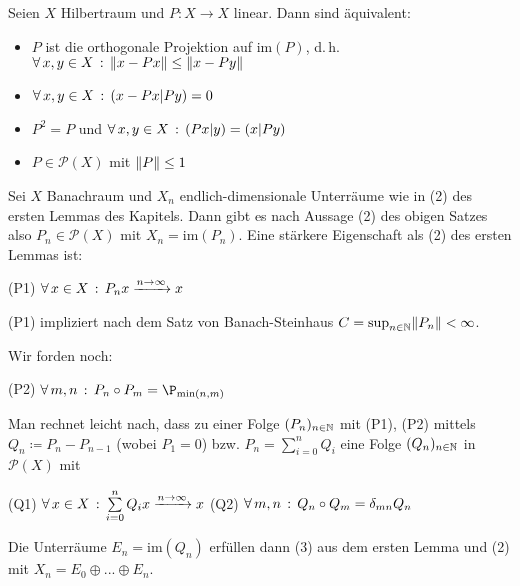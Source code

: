 \documentclass{cheat-sheet}
\begin{document}
\begin{lem}
  Seien $X$ Hilbertraum und $P : X \to X$ linear. Dann sind äquivalent:
  \begin{itemize}
    \item $P$ ist die orthogonale Projektion auf $\mathrm{im}(P)$, d.\,h. $\forall \, {x,y \in X} \,:\, \lVert x-Px\rVert \leq \lVert x - Py\rVert$
    \item $\forall \, {x,y \in X} \,:\, (x-Px | Py) = 0$
    \item $P^2 = P$ und $\forall \, {x,y \in X} \,:\, (Px | y) = (x | Py)$
    \item $P \in \mathcal{P}(X)$ mit $\lVert P\rVert \leq 1$
  \end{itemize}
\end{lem}

Sei $X$ Banachraum und $X_n$ endlich-dimensionale Unterräume wie in (2) des ersten Lemmas des Kapitels. Dann gibt es nach Aussage (2) des obigen Satzes also $P_n \in \mathcal{P}(X)$ mit $X_n = \mathrm{im}(P_n)$. Eine stärkere Eigenschaft als (2) des ersten Lemmas ist:

(P1) $\forall \, {x \in X} \,:\, P_n x \xrightarrow{n \to \infty} x$

(P1) impliziert nach dem Satz von Banach-Steinhaus $C = \sup_{n \in \mathbb{N}} \lVert P_n\rVert < \infty$.

Wir forden noch:

(P2) $\fa{m, n} P_n \circ P_m = \P_{\min(n, m)}$

Man rechnet leicht nach, dass zu einer Folge $(P_n)_{n \in \mathbb{N}}$ mit (P1), (P2) mittels $Q_n \coloneqq P_n - P_{n-1}$ (wobei $P_1 = 0$) bzw. $P_n = \sum_{i=0}^n Q_i$ eine Folge $(Q_n)_{n \in \mathbb{N}}$ in $\mathcal{P}(X)$ mit

(Q1) $\fa{x \in X} \sum_{i=0}^n Q_i x \xrightarrow{n \to \infty} x$
(Q2) $\forall \, {m,n} \,:\, Q_n \circ Q_m = \delta_{mn} Q_n$

Die Unterräume $E_n = \mathrm{im}(Q_n)$ erfüllen dann (3) aus dem ersten Lemma und (2) mit $X_n = E_0 \oplus ... \oplus E_n$.
\end{document}
